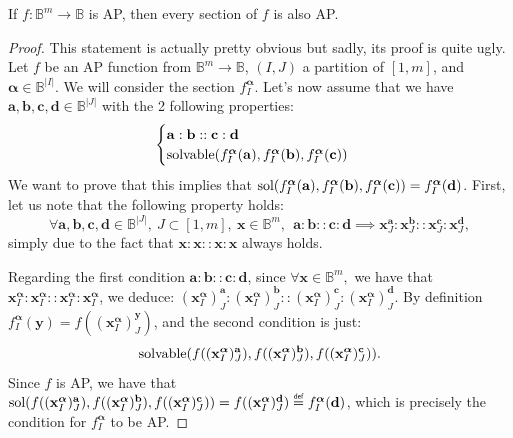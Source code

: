 \begin{property}\label{section_preserve_wap}
If $f\colon \mathbb{B}^m\to \mathbb{B}$ is AP, then every section of $f$ is
  also AP.
\end{property}
\begin{proof}
  This statement is actually pretty obvious but sadly, its proof is quite ugly.
  Let $f$ be an AP function from $\mathbb{B}^m \to \mathbb{B}$, $(I,J)$ a
  partition of $[1, m]$, and $\boldsymbol{\alpha} \in \mathbb{B}^{|I|}$. We
  will consider the section  $f^{\boldsymbol{\alpha}}_I$.  Let's now assume
  that we have $\mathbf{a},\mathbf{b},\mathbf{c}, \mathbf{d} \in
  \mathbb{B}^{|J|}$ with the 2 following properties:
  $$
  \begin{cases}
    \mathbf{a}:\mathbf{b}::\mathbf{c}:\mathbf{d}\\
    \text{solvable}(f^{\boldsymbol{\alpha}}_I(\mathbf{a}),
    f^{\boldsymbol{\alpha}}_I(\mathbf{b}),
    f^{\boldsymbol{\alpha}}_I(\mathbf{c}))
  \end{cases}
  $$
  We want to prove that this implies that
  $\text{sol}(f^{\boldsymbol{\alpha}}_I(\mathbf{a}),
  f^{\boldsymbol{\alpha}}_I(\mathbf{b}), 
  f^{\boldsymbol{\alpha}}_I(\mathbf{c}))
  =
  f^{\boldsymbol{\alpha}}_I(\mathbf{d})$.
  First, let us note that the following property holds:
$$\forall \mathbf{a},\mathbf{b},\mathbf{c}, \mathbf{d} \in \mathbb{B}^{|J|},~J
  \subset [1,m], ~ \mathbf{x} \in \mathbb{B}^m,~~ \mathbf{a}: \mathbf{b} ::
  \mathbf{c} : \mathbf{d} \implies \mathbf{x}^{\mathbf{a}}_J :
  \mathbf{x}^{\mathbf{b}}_J:: \mathbf{x}^{\mathbf{c}}_J :
  \mathbf{x}^{\mathbf{d}}_J,$$
  simply due to the fact that $\mathbf{x}:\mathbf{x}::\mathbf{x}:\mathbf{x}$
  always holds.

Regarding the first condition $\mathbf{a}:\mathbf{b}::\mathbf{c}:\mathbf{d}$,
since $\forall \mathbf{x} \in \mathbb{B}^m,$ we have that $
  \mathbf{x}^{\boldsymbol{\alpha}}_I : \mathbf{x}^{\boldsymbol{\alpha}}_I ::
  \mathbf{x}^{\boldsymbol{\alpha}}_I : \mathbf{x}^{\boldsymbol{\alpha}}_I$, we
  deduce: $(\mathbf{x}^{\boldsymbol{\alpha}}_I)^{\mathbf{a}}_J :
  (\mathbf{x}^{\boldsymbol{\alpha}}_I)^{\mathbf{b}}_J ::
  (\mathbf{x}^{\boldsymbol{\alpha}}_I)^{\mathbf{c}}_J :
  (\mathbf{x}^{\boldsymbol{\alpha}}_I)^{\mathbf{d}}_J$.
By definition $f^{\boldsymbol{\boldsymbol{\alpha}}}_I(\mathbf{y}) =
  f((\mathbf{x}^{\boldsymbol{\alpha}}_I)^{\mathbf{y}}_J)$, and the second
  condition is just:
  $$\text{solvable}(f((\mathbf{x}^{\boldsymbol{\alpha}}_I)^\mathbf{a}_J),
  f((\mathbf{x}^{\boldsymbol{\alpha}}_I)^\mathbf{b}_J),
  f((\mathbf{x}^{\boldsymbol{\alpha}}_I)^\mathbf{c}_J)).$$
  Since $f$ is AP, we have that
  $\sol(f((\mathbf{x}^{\boldsymbol{\alpha}}_I)^\mathbf{a}_J),
  f((\mathbf{x}^{\boldsymbol{\alpha}}_I)^\mathbf{b}_J),
  f((\mathbf{x}^{\boldsymbol{\alpha}}_I)^\mathbf{c}_J))=
  f((\mathbf{x}^{\boldsymbol{\alpha}}_I)^\mathbf{d}_J) \eqdef
  f^{\boldsymbol{\alpha}}_I(\mathbf{d})$,
  which is precisely the condition for
  $f^{\boldsymbol{\boldsymbol{\alpha}}}_I$ to be AP.
\end{proof}


